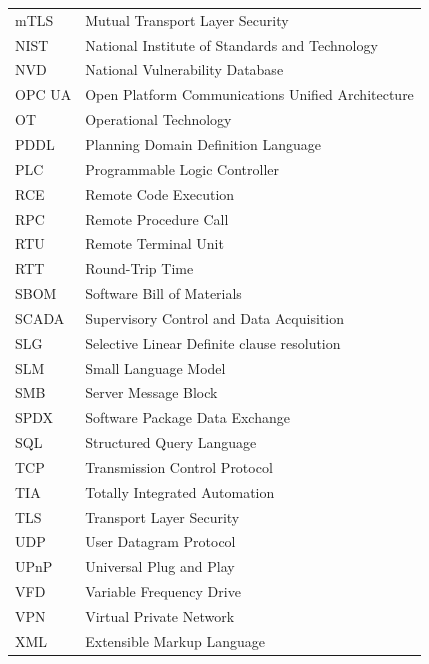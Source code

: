 \documentclass[target=mst,aauheader=aics,style=]{thud}
\begin{document}
\begin{longtable}{p{3.0cm}p{10.0cm}}
    mTLS & Mutual Transport Layer Security \\
    NIST & National Institute of Standards and Technology \\
    NVD & National Vulnerability Database \\
    OPC UA & Open Platform Communications Unified Architecture \\
    OT & Operational Technology \\
    PDDL & Planning Domain Definition Language \\
    PLC & Programmable Logic Controller \\
    RCE & Remote Code Execution \\
    RPC & Remote Procedure Call \\
    RTU & Remote Terminal Unit \\
    RTT & Round-Trip Time \\
    SBOM & Software Bill of Materials \\
    SCADA & Supervisory Control and Data Acquisition \\
    SLG & Selective Linear Definite clause resolution \\
    SLM & Small Language Model \\
    SMB & Server Message Block \\
    SPDX & Software Package Data Exchange \\
    SQL & Structured Query Language \\
    TCP & Transmission Control Protocol \\
    TIA & Totally Integrated Automation \\
    TLS & Transport Layer Security \\
    UDP & User Datagram Protocol \\
    UPnP & Universal Plug and Play \\
    VFD & Variable Frequency Drive \\
    VPN & Virtual Private Network \\
    XML & Extensible Markup Language \\
    \bottomrule
\end{longtable}
\end{document}
